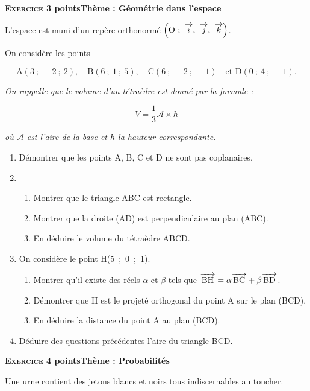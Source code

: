 \documentclass[11pt,a4paper,french]{article}
\newcommand{\vect}[1]{\overrightarrow{\,\mathstrut#1\,}}
\def\Oijk{$\left(\text{O}~;~\vect{\imath},~\vect{\jmath},~\vect{k}\right)$}
\begin{document}
\bigskip

\textbf{\textsc{Exercice 3}  points\hfill Thème : Géométrie dans l'espace}

\medskip

L'espace est muni d'un repère orthonormé \Oijk.

On considère les points 

\[\text{A}(3~;~-2~;~2),\quad \text{B}(6~;~1~;~5),\quad \text{C}(6~;~-2~;~-1)\quad \text{et D}(0~;~4~;~-1).\]

\emph{On rappelle que le volume d'un tétraèdre est donné par la formule :}

\[V = \dfrac13 \mathcal{A} \times h\]

\emph{où $\mathcal{A}$ est l'aire de la base et $h$ la hauteur correspondante.}

\medskip

\begin{enumerate}
\item Démontrer que les points A, B, C et D ne sont pas coplanaires.
\item 
	\begin{enumerate}
		\item Montrer que le triangle ABC est rectangle.
		\item Montrer que la droite (AD) est perpendiculaire au plan (ABC).
		\item En déduire le volume du tétraèdre ABCD.
	\end{enumerate}	
\item On considère le point H(5~;~0~;~1).
	\begin{enumerate}
		\item Montrer qu'il existe des réels $\alpha$ et $\beta$ tels que $\vect{\text{BH}} = \alpha \vect{\text{BC}} + \beta \vect{\text{BD}}$.
		\item Démontrer que H est le projeté orthogonal du point A sur le plan (BCD). 
		\item En déduire la distance du point A au plan (BCD).
	\end{enumerate}	
\item Déduire des questions précédentes l'aire du triangle BCD.
\end{enumerate}

\bigskip

\textbf{\textsc{Exercice 4}  points\hfill Thème : Probabilités}

\medskip

Une urne contient des jetons blancs et noirs tous indiscernables au toucher.
\end{document}
